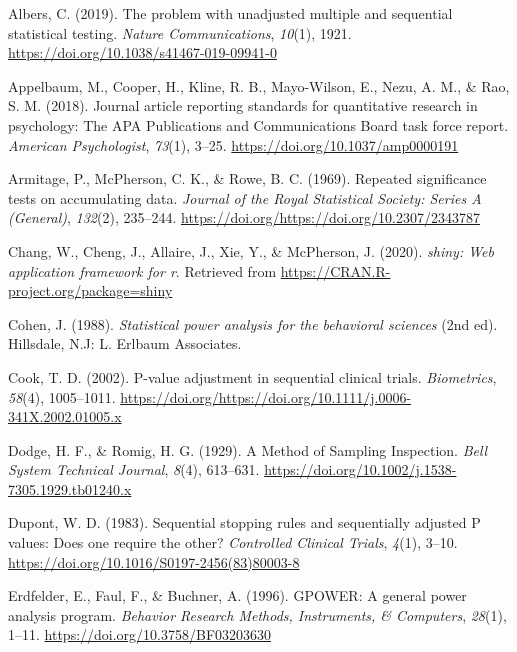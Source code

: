\documentclass[
  english,
  ,jou, a4paper,floatsintext]{apa6}
\newlength{\cslhangindent}
\newenvironment{cslreferences}%
  {\setlength{\parindent}{0pt}%
  \everypar{\setlength{\hangindent}{\cslhangindent}}\ignorespaces}%
  {\par}
\begin{document}
\hypertarget{refs}{}
\begin{cslreferences}
\leavevmode\hypertarget{ref-albers_problem_2019}{}%
Albers, C. (2019). The problem with unadjusted multiple and sequential statistical testing. \emph{Nature Communications}, \emph{10}(1), 1921. \url{https://doi.org/10.1038/s41467-019-09941-0}

\leavevmode\hypertarget{ref-appelbaum_journal_2018}{}%
Appelbaum, M., Cooper, H., Kline, R. B., Mayo-Wilson, E., Nezu, A. M., \& Rao, S. M. (2018). Journal article reporting standards for quantitative research in psychology: The APA Publications and Communications Board task force report. \emph{American Psychologist}, \emph{73}(1), 3--25. \url{https://doi.org/10.1037/amp0000191}

\leavevmode\hypertarget{ref-armitage_repeated_1969}{}%
Armitage, P., McPherson, C. K., \& Rowe, B. C. (1969). Repeated significance tests on accumulating data. \emph{Journal of the Royal Statistical Society: Series A (General)}, \emph{132}(2), 235--244. \url{https://doi.org/https://doi.org/10.2307/2343787}

\leavevmode\hypertarget{ref-shiny_app_2020}{}%
Chang, W., Cheng, J., Allaire, J., Xie, Y., \& McPherson, J. (2020). \emph{shiny: Web application framework for r}. Retrieved from \url{https://CRAN.R-project.org/package=shiny}

\leavevmode\hypertarget{ref-cohen_statistical_1988}{}%
Cohen, J. (1988). \emph{Statistical power analysis for the behavioral sciences} (2nd ed). Hillsdale, N.J: L. Erlbaum Associates.

\leavevmode\hypertarget{ref-cook_p-value_2002}{}%
Cook, T. D. (2002). P-value adjustment in sequential clinical trials. \emph{Biometrics}, \emph{58}(4), 1005--1011. \url{https://doi.org/https://doi.org/10.1111/j.0006-341X.2002.01005.x}

\leavevmode\hypertarget{ref-dodge_method_1929}{}%
Dodge, H. F., \& Romig, H. G. (1929). A Method of Sampling Inspection. \emph{Bell System Technical Journal}, \emph{8}(4), 613--631. \url{https://doi.org/10.1002/j.1538-7305.1929.tb01240.x}

\leavevmode\hypertarget{ref-dupont_sequential_1983}{}%
Dupont, W. D. (1983). Sequential stopping rules and sequentially adjusted P values: Does one require the other? \emph{Controlled Clinical Trials}, \emph{4}(1), 3--10. \url{https://doi.org/10.1016/S0197-2456(83)80003-8}

\leavevmode\hypertarget{ref-erdfelder_gpower_1996}{}%
Erdfelder, E., Faul, F., \& Buchner, A. (1996). GPOWER: A general power analysis program. \emph{Behavior Research Methods, Instruments, \& Computers}, \emph{28}(1), 1--11. \url{https://doi.org/10.3758/BF03203630}


\end{cslreferences}
\end{document}
